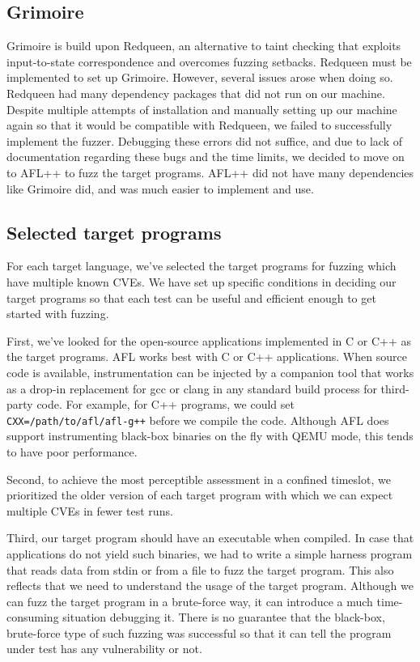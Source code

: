 \documentclass[12pt]{diazessay}
\begin{document}
\subsection*{Grimoire}

Grimoire is build upon Redqueen, an alternative to taint checking that exploits input-to-state correspondence and overcomes fuzzing setbacks. 
Redqueen must be implemented to set up Grimoire. However, several issues arose when doing so. Redqueen had many dependency packages that did not run on our machine. 
Despite multiple attempts of installation and manually setting up our machine again so that it would be compatible with Redqueen, we failed to successfully implement the fuzzer.
Debugging these errors did not suffice, and due to lack of documentation regarding these bugs and the time limits, we decided to move on to AFL++ to fuzz the target programs. 
AFL++ did not have many dependencies like Grimoire did, and was much easier to implement and use. 

\subsection*{Selected target programs}


For each target language, we've selected the target programs for fuzzing which have multiple known CVEs.
We have set up specific conditions in deciding our target programs so that each test can be useful and efficient enough to get started with fuzzing.

First, we've looked for the open-source applications implemented in C or C++ as the target programs.
AFL works best with C or C++ applications. 
When source code is available, instrumentation can be injected by a companion tool that works as a drop-in replacement for gcc or clang in any standard build process for third-party code. 
For example, for C++ programs, we could set \texttt{CXX=/path/to/afl/afl-g++} before we compile the code.
Although AFL does support instrumenting black-box binaries on the fly with QEMU mode, this tends to have poor performance. 

Second, to achieve the most perceptible assessment in a confined timeslot, we prioritized the older version of each target program with which we can expect multiple CVEs in fewer test runs.

Third, our target program should have an executable when compiled.
In case that applications do not yield such binaries, we had to write a simple harness program that reads data from stdin or from a file to fuzz the target program.
This also reflects that we need to understand the usage of the target program.
Although we can fuzz the target program in a brute-force way, it can introduce a much time-consuming situation debugging it.
There is no guarantee that the black-box, brute-force type of such fuzzing was successful so that it can tell the program under test has any vulnerability or not.
\end{document}
